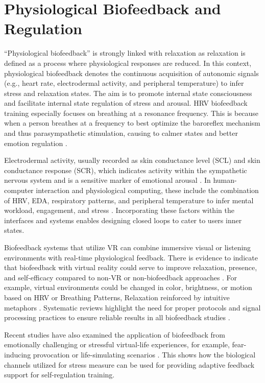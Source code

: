 \section{Physiological Biofeedback and Regulation}
“Physiological biofeedback” is strongly linked with relaxation as relaxation is defined as a process where physiological responses are reduced. In this context, physiological biofeedback denotes the continuous acquisition of autonomic signals (e.g., heart rate, electrodermal activity, and peripheral temperature) to infer stress and relaxation states. The aim is to promote internal state consciousness and facilitate internal state regulation of stress and arousal. HRV biofeedback training especially focuses on breathing at a resonance frequency. This is because when a person breathes at a
frequency to best optimize the baroreflex mechanism and thus parasympathetic stimulation, causing to calmer states and better emotion regulation  \cite{lehrer2013baro}.

Electrodermal activity, usually recorded as skin conductance level (SCL) and skin conductance response (SCR), which indicates activity within the sympathetic nervous system and is a sensitive marker of emotional arousal \cite{boucsein2012eda}. In human-computer interaction and physiological computing, these include the combination of HRV, EDA, respiratory patterns, and peripheral temperature to infer mental workload, engagement, and stress  \cite{fairclough2009physio}. Incorporating these factors within the interfaces and systems enables designing closed loops to cater to users inner states.

Biofeedback systems that utilize VR can combine immersive visual or listening environments with real-time physiological feedback. There is evidence to indicate that biofeedback with virtual reality could serve to improve relaxation, presence, and self-efficacy compared to non-VR or non-biofeedback approaches \cite{weibel2020biofeedback,brief2025vrbiofeedback}. For example, virtual environments could be changed in color, brightness, or motion based on HRV or Breathing Patterns, Relaxation reinforced by intuitive metaphors \cite{chittaro2018placebo,bouny2020haptic}. Systematic reviews highlight the need for proper protocols and signal processing practices to ensure reliable results in all biofeedback studies \cite{applied2020review}.

Recent studies have also examined the application of biofeedback from emotionally challenging or stressful virtual-life experiences, for example, fear-inducing provocation or life-simulating scenarios  \cite{houzangbe2018biofeedback,rubio2025stress,rodrigues2021IMVEST}. This shows how the biological channels utilized for stress measure can be used for providing adaptive feedback support for self-regulation training.

